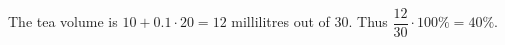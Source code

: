 The tea volume is $10+0.1\cdot20=12$ millilitres out of 30. Thus $\dfrac{12}{30}\cdot100\%=\boxed{40\%}$.
